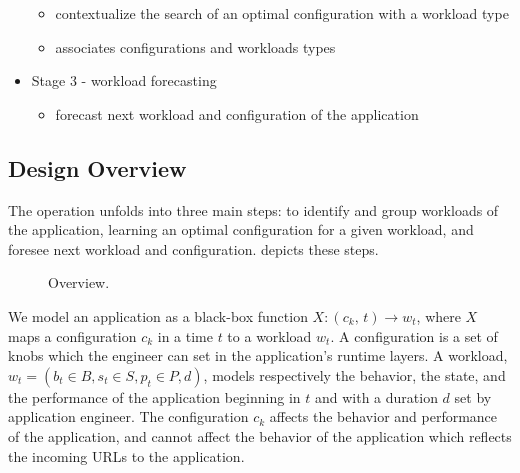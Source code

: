 \begin{itemize}
\begin{itemize}
        \item contextualize the search of an optimal configuration with a
          workload type

        \item associates configurations and workloads types

      \end{itemize}

   \item Stage 3 - workload forecasting

      \begin{itemize}

        \item forecast next workload and configuration of the application

      \end{itemize}
 \end{itemize}

\subsection{Design Overview}


The \name operation unfolds into three main steps: to identify and group
workloads of the application, learning an optimal configuration for a given
workload, and foresee next workload and configuration. 
depicts these steps.

\begin{figure*}[htp]
    \centering
    \def\svgwidth{\textwidth}
    \scalebox{1.0}{}
    \caption{\name Overview.}
    \label{fig:design-overview}
\end{figure*}

We model an application as a black-box function $X: (c_k,\, t) \rightarrow w_t$,
where $X$ maps a configuration $c_k$ in a time $t$ to a workload $w_t$.  A
configuration is a set of knobs which the engineer can set in the application's
runtime layers. A workload, $w_{t} = (b_t \in B, s_t \in S, p_t \in P, d)$,
models respectively the behavior, the state, and the performance of the
application beginning in $t$ and with a duration $d$ set by application
engineer. The configuration $c_k$ affects the behavior and performance of the
application, and cannot affect the behavior of the application which
reflects the incoming URLs to the application.

